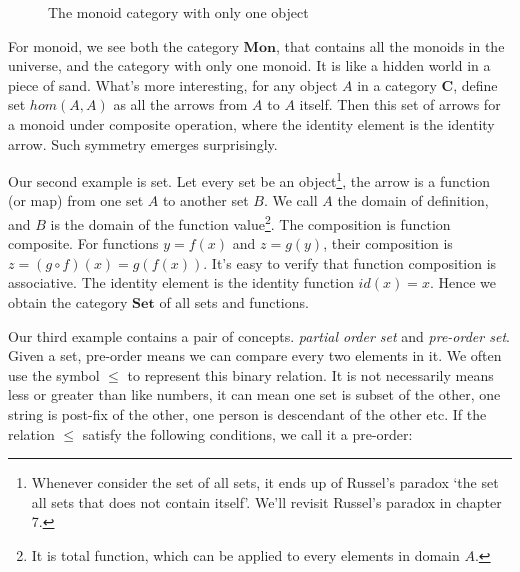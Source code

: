 \documentclass{article}
\begin{document}
\begin{figure}[htbp]
\centering
{}
\caption{The monoid category with only one object}
\label{fig:monoid-as-category}
\end{figure}

For monoid, we see both the category $\pmb{Mon}$, that contains all the monoids in the universe, and the category with only one monoid. It is like a hidden world in a piece of sand. What's more interesting, for any object $A$ in a category $\pmb{C}$, define set $hom(A, A)$ as all the arrows from $A$ to $A$ itself. Then this set of arrows for a monoid under composite operation, where the identity element is the identity arrow. Such symmetry emerges surprisingly.

Our second example is set. Let every set be an object\footnote{Whenever consider the set of all sets, it ends up of Russel's paradox `the set all sets that does not contain itself'. We'll revisit Russel's paradox in chapter 7.}, the arrow is a function (or map) from one set $A$ to another set $B$. We call $A$ the domain of definition, and $B$ is the domain of the function value\footnote{It is total function, which can be applied to every elements in domain $A$.}. The composition is function composite. For functions $y = f(x)$ and $z = g(y)$, their composition is $z = (g \circ f)(x) = g(f(x))$. It's easy to verify that function composition is associative. The identity element is the identity function $id(x) = x$. Hence we obtain the category $\pmb{Set}$ of all sets and functions.

 
 
Our third example contains a pair of concepts. {\em partial order set} and {\em pre-order set}. Given a set, pre-order means we can compare every two elements in it. We often use the symbol $\leq$ to represent this binary relation. It is not necessarily means less or greater than like numbers, it can mean one set is subset of the other, one string is post-fix of the other, one person is descendant of the other etc. If the relation $\leq$ satisfy the following conditions, we call it a pre-order:
\end{document}
